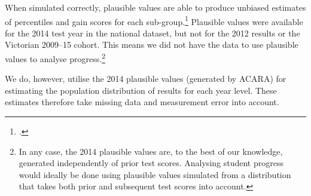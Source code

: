 When simulated correctly, plausible values are able to produce unbiased estimates of percentiles and gain scores for each sub-group.\footcite{wu2005} Plausible values were available for the 2014 test year in the national dataset, but not for the 2012 results or the Victorian 2009--15 cohort. This means we did not have the data to use plausible values to analyse progress.\footnote{In any case, the 2014 plausible values are, to the best of our knowledge, generated independently of prior test scores. Analysing student progress would ideally be done using plausible values simulated from a distribution that takes both prior and subsequent test scores into account.}

We do, however, utilise the 2014 plausible values (generated by ACARA) for estimating the population distribution of results for each year level. These estimates therefore take missing data and measurement error into account. 